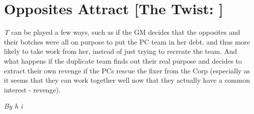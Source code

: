 \documentclass[letterpaper,twocolumn,10.5pt]{article}
\newenvironment{scenario}[6]
	{
		\section{#1 {\small[#2]}}
		\textit{#3}
		\def\TMPSCENARIO{#4 #5}
	}
	{\small\textit{By \TMPSCENARIO}}
\newcommand{\twist}{\textbf{The Twist: }}
\begin{document}
\begin{scenario}{Opposites Attract}
\twist This can be played a few ways, such as if the GM decides that the opposites and their botches were all on purpose to put the PC team in her debt, and thus more likely to take work from her, instead of just trying to recreate the team. And what happens if the duplicate team finds out their real purpose and decides to extract their own revenge if the PCs rescue the fixer from the Corp (especially as it seems that they can work together well now that they actually have a common interest - revenge). 

\end{scenario}
\end{document}
